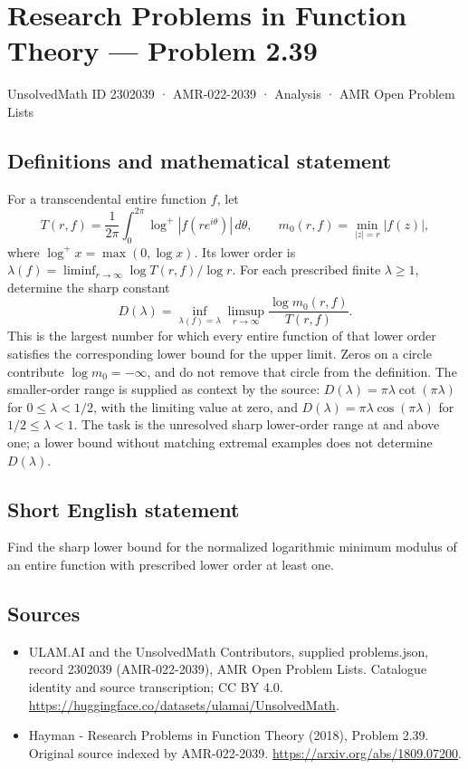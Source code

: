 \documentclass[11pt,a4paper]{article}
\begin{document}
\section*{Research Problems in Function Theory — Problem 2.39}\label{2302039}
{\small UnsolvedMath ID 2302039 · AMR-022-2039 · Analysis · AMR Open Problem Lists}
\subsection{Definitions and mathematical statement}
For a transcendental entire function $f$, let
\[
T(r,f)=\frac1{2\pi}\int_0^{2\pi}\log^+|f(re^{i\theta})|\,d\theta,
\qquad m_0(r,f)=\min_{|z|=r}|f(z)|,
\]
where $\log^+x=\max(0,\log x)$. Its lower order is
$\lambda(f)=\liminf_{r\to\infty}\log T(r,f)/\log r$.
For each prescribed finite $\lambda\ge1$, determine the sharp constant
\[
D(\lambda)=\inf_{\lambda(f)=\lambda}
\limsup_{r\to\infty}\frac{\log m_0(r,f)}{T(r,f)}.
\]
This is the largest number for which every entire function of that lower order satisfies the corresponding lower bound for the upper limit. Zeros on a circle contribute $\log m_0=-\infty$, and do not remove that circle from the definition.
The smaller-order range is supplied as context by the source:
$D(\lambda)=\pi\lambda\cot(\pi\lambda)$ for $0\le\lambda<1/2$, with the limiting value at zero, and $D(\lambda)=\pi\lambda\cos(\pi\lambda)$ for $1/2\le\lambda<1$.
The task is the unresolved sharp lower-order range at and above one; a lower bound without matching extremal examples does not determine $D(\lambda)$.
\subsection{Short English statement}
Find the sharp lower bound for the normalized logarithmic minimum modulus of an entire function with prescribed lower order at least one.
\subsection{Sources}
\begin{itemize}
\item[S1] ULAM.AI and the UnsolvedMath Contributors, supplied problems.json, record 2302039 (AMR-022-2039), AMR Open Problem Lists. Catalogue identity and source transcription; CC BY 4.0.
\url{https://huggingface.co/datasets/ulamai/UnsolvedMath}.
\item[S2] Hayman - Research Problems in Function Theory (2018), Problem 2.39. Original source indexed by AMR-022-2039.
\url{https://arxiv.org/abs/1809.07200}.
\end{itemize}
\end{document}
